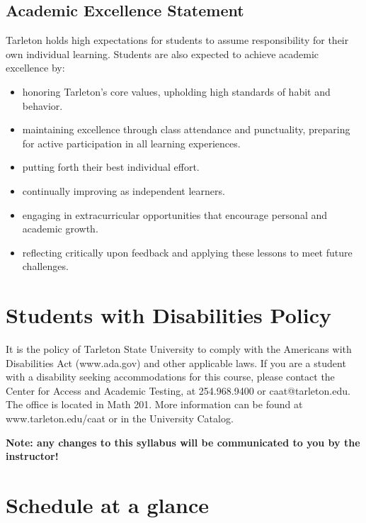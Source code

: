 \documentclass[10pt]{article}
\begin{document}
\subsection*{Academic Excellence Statement}
\label{sec:org29fc04d}
Tarleton holds high expectations for students to assume responsibility for their own individual learning. Students are also expected to achieve academic excellence by:
\begin{itemize}
\item honoring Tarleton’s core values, upholding high standards of habit and behavior.
\item maintaining excellence through class attendance and punctuality, preparing for active participation in all learning experiences.
\item putting forth their best individual effort.
\item continually improving as independent learners.
\item engaging in extracurricular opportunities that encourage personal and academic growth.
\item reflecting critically upon feedback and applying these lessons to meet future challenges.
\end{itemize}

\section*{Students with Disabilities Policy}
\label{sec:orgf5093da}

It is the policy of Tarleton State University to comply with the Americans with Disabilities  Act (www.ada.gov) and other applicable laws.  If you are a student with a disability seeking accommodations for this course, please contact the Center for Access and Academic Testing, at 254.968.9400 or caat@tarleton.edu. The office is located in Math 201. More information can be found at www.tarleton.edu/caat or in the University Catalog.​

\textbf{Note:  any changes to this syllabus will be communicated to you by the instructor!}

\section*{Schedule at a glance}
\label{sec:org23e33e3}
\end{document}

